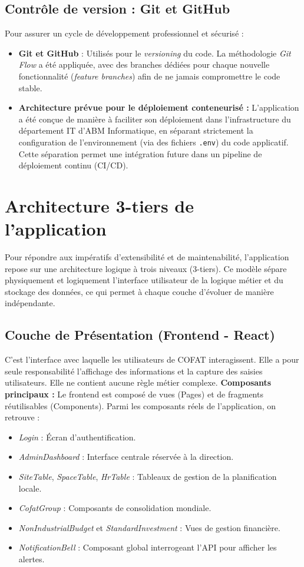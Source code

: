 \subsection{Contrôle de version : Git et GitHub}
Pour assurer un cycle de développement professionnel et sécurisé :
\begin{itemize}
    \item \textbf{Git et GitHub} : Utilisés pour le \textit{versioning} du code. La méthodologie \textit{Git Flow} a été appliquée, avec des branches dédiées pour chaque nouvelle fonctionnalité (\textit{feature branches}) afin de ne jamais compromettre le code stable.
    \item \textbf{Architecture prévue pour le déploiement conteneurisé :} L'application a été conçue de manière à faciliter son déploiement dans l'infrastructure du département IT d'ABM Informatique, en séparant strictement la configuration de l'environnement (via des fichiers \texttt{.env}) du code applicatif. Cette séparation permet une intégration future dans un pipeline de déploiement continu (CI/CD).
\end{itemize}

\section{Architecture 3-tiers de l'application}
Pour répondre aux impératifs d'extensibilité et de maintenabilité, l'application repose sur une architecture logique à trois niveaux (3-tiers). Ce modèle sépare physiquement et logiquement l'interface utilisateur de la logique métier et du stockage des données, ce qui permet à chaque couche d'évoluer de manière indépendante.

\subsection{Couche de Présentation (Frontend - React)}
C'est l'interface avec laquelle les utilisateurs de COFAT interagissent. Elle a pour seule responsabilité l'affichage des informations et la capture des saisies utilisateurs. Elle ne contient aucune règle métier complexe.
\newline
\textbf{Composants principaux :} Le frontend est composé de vues (Pages) et de fragments réutilisables (Components). Parmi les composants réels de l'application, on retrouve :
\begin{itemize}
    \item \textit{Login} : Écran d'authentification.
    \item \textit{AdminDashboard} : Interface centrale réservée à la direction.
    \item \textit{SiteTable}, \textit{SpaceTable}, \textit{HrTable} : Tableaux de gestion de la planification locale.
    \item \textit{CofatGroup} : Composants de consolidation mondiale.
    \item \textit{NonIndustrialBudget} et \textit{StandardInvestment} : Vues de gestion financière.
    \item \textit{NotificationBell} : Composant global interrogeant l'API pour afficher les alertes.
\end{itemize}


